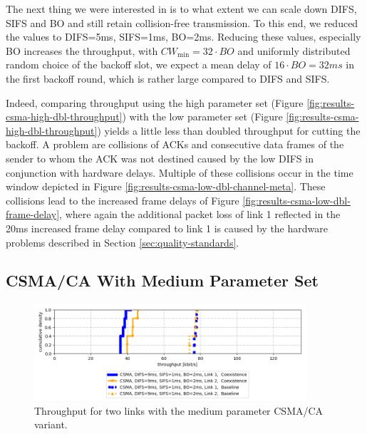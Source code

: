 The next thing we were interested in is to what extent we can scale down DIFS, SIFS and BO and still retain collision-free transmission. To this end, we reduced the values to DIFS=5ms, SIFS=1ms, BO=2ms. Reducing these values, especially BO increases the throughput, with $CW_\text{min} = 32 \cdot BO$ and uniformly distributed random choice of the backoff slot, we expect a mean delay of $16\cdot BO=32ms$ in the first backoff round, which is rather large compared to DIFS and SIFS.

 Indeed, comparing throughput using the high parameter set (Figure \ref{fig:results-csma-high-dbl-throughput}) with the low parameter set (Figure \ref{fig:results-csma-high-dbl-throughput}) yields a little less than doubled throughput for cutting the backoff. 
 A problem are collisions of ACKs and consecutive data frames of the sender to whom the ACK was not destined caused by the low DIFS in conjunction with hardware delays. Multiple of these collisions occur in the time window depicted in Figure \ref{fig:results-csma-low-dbl-channel-meta}. These collisions lead to the increased frame delays of Figure \ref{fig:results-csma-low-dbl-frame-delay}, where again the additional packet loss of link 1 reflected in the 20ms increased frame delay compared to link 1 is caused by the hardware problems described in Section \ref{sec:quality-standards}.

\clearpage

\subsection{CSMA/CA With Medium Parameter Set}

\begin{figure}[tb]
	\label{fig:results-csma-med-dbl-throughput}
	\begin{center}
		\includegraphics[width=0.9\textwidth]{pictures/results/same_combinations/csma_med_params/throughput_cdf}
	\end{center}
	\caption{Throughput for two links with the medium parameter CSMA/CA variant.}
\end{figure}

